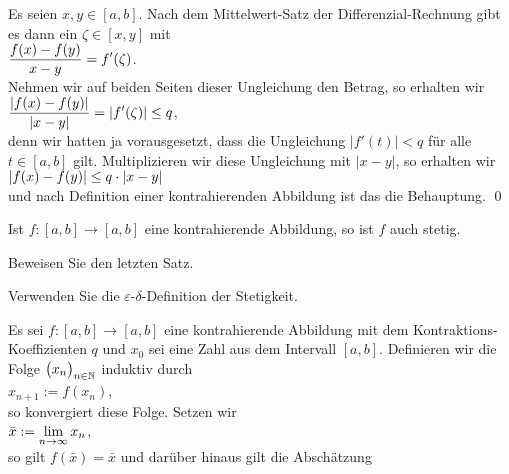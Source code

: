 \proof
Es seien $x, y \in [a,b]$.
Nach dem Mittelwert-Satz der Differenzial-Rechnung gibt es dann ein $\zeta\in[x,y]$ mit 
\\[0.2cm]
\hspace*{1.3cm}
$\displaystyle\frac{f(x) - f(y)}{x - y} = f'(\zeta)$.
\\[0.2cm]
Nehmen wir auf beiden Seiten dieser Ungleichung den Betrag, so erhalten wir
\\[0.2cm]
\hspace*{1.3cm}
$\displaystyle\frac{|f(x) - f(y)|}{|x - y|} = |f'(\zeta)| \leq q$,
\\[0.2cm]
denn wir hatten ja vorausgesetzt, dass die Ungleichung $|f'(t)| < q$ f\"ur alle
$t \in [a,b]$ gilt.  Multiplizieren wir diese Ungleichung mit $|x - y|$, so erhalten wir
\\[0.2cm]
\hspace*{1.3cm}
$\displaystyle |f(x) - f(y)| \leq q \cdot |x  - y|$
\\[0.2cm]
und nach Definition einer kontrahierenden Abbildung ist das die Behauptung.
\qed
\pagebreak

\begin{Satz}
  Ist $f:[a,b] \rightarrow [a,b]$ eine kontrahierende Abbildung, so ist $f$ auch stetig.
\end{Satz}

\exercise
Beweisen Sie den letzten Satz.

\hint
Verwenden Sie die $\varepsilon$-$\delta$-Definition der Stetigkeit.
\eox

\begin{Satz} \lb
Es sei $f:[a,b] \rightarrow [a,b]$ eine kontrahierende Abbildung mit dem
Kontraktions-Koeffizienten $q$ und $x_0$ sei eine Zahl aus dem Intervall $[a,b]$.  
Definieren wir die Folge $\bigl(x_n\bigr)_{n\in\mathbb{N}}$ induktiv durch
\\[0.2cm]
\hspace*{1.3cm} $x_{n+1} := f(x_n)$,
\\[0.2cm]
so konvergiert diese Folge.  Setzen wir 
\\[0.2cm]
\hspace*{1.3cm}
$\displaystyle\bar{x} := \lim\limits_{n\rightarrow\infty} x_n$,
\\[0.2cm]
so gilt $f(\bar{x}) = \bar{x}$ und dar\"uber hinaus gilt die Absch\"atzung 
\\[0.2cm]
\hspace*{1.3cm}
\colorbox{red}{\colorbox{orange}{}}
\end{Satz}

